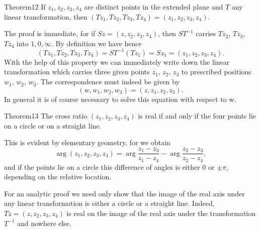 \begin{originalstatement}{Theorem}{12}\label{thm:3.12}
If $z_1, z_2, z_3, z_4$ are distinct points in the extended plane and $T$ any linear transformation, then $(Tz_1, Tz_2, Tz_3, Tz_4) = (z_1, z_2, z_3, z_4)$.
\end{originalstatement}
The proof is immediate, for if $Sz = (z, z_2, z_3, z_4)$, then $ST^{-1}$ carries $Tz_2$, $Tz_3$, $Tz_4$ into $1, 0, \infty$. By definition we have hence
\begin{equation*}
(T z _ {1}, T z _ {2}, T z _ {3}, T z _ {4}) = S T ^ {- 1} (T z _ {1}) = S z _ {1} = (z _ {1}, z _ {2}, z _ {3}, z _ {4}).
\end{equation*}
With the help of this property we can immediately write down the linear transformation which carries three given points $z_{1}$, $z_{2}$, $z_{3}$ to prescribed positions $w_{1}$, $w_{2}$, $w_{3}$. The correspondence must indeed be given by
\begin{equation*}
(w, w _ {1}, w _ {2}, w _ {3}) = (z, z _ {1}, z _ {2}, z _ {3}).
\end{equation*}
In general it is of course necessary to solve this equation with respect to w.

\begin{originalstatement}{Theorem}{13}\label{thm:3.13}
The cross ratio $(z_{1}, z_{2}, z_{3}, z_{4})$ is real if and only if the four points lie on a circle or on a straight line.
\end{originalstatement}
This is evident by elementary geometry, for we obtain
\begin{equation*}
\arg \left(z _ {1}, z _ {2}, z _ {3}, z _ {4}\right) = \arg \frac {z _ {1} - z _ {3}}{z _ {1} - z _ {4}} - \arg \frac {z _ {2} - z _ {3}}{z _ {2} - z _ {4}},
\end{equation*}
and if the points lie on a circle this difference of angles is either 0 or $\pm\pi$, depending on the relative location.

For an analytic proof we need only show that the image of the real axis under any linear transformation is either a circle or a straight line. Indeed, $Tz = (z, z_{2}, z_{3}, z_{4})$ is real on the image of the real axis under the transformation $T^{-1}$ and nowhere else.

